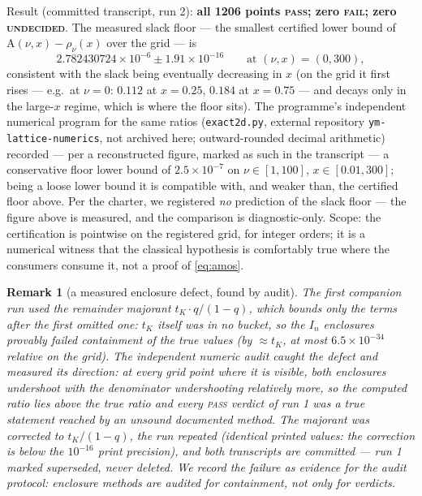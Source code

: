 \documentclass[11pt]{article}
\newtheorem{remark}[theorem]{Remark}
\newcommand{\lean}[1]{\texttt{#1}}
\newcommand{\RHS}{\mathrm{A}}
\begin{document}
Result (committed transcript, run 2): \textbf{all 1206 points
\textsc{pass}; zero \textsc{fail}; zero \textsc{undecided}}.  The
measured slack floor --- the smallest certified lower bound of
$\RHS(\nu,x) - \rho_\nu(x)$ over the grid --- is
\[
2.782430724 \times 10^{-6} \pm 1.91\times 10^{-16}
\qquad \text{at } (\nu, x) = (0, 300),
\]
consistent with the slack being eventually decreasing in $x$ (on the
grid it first rises --- e.g.\ at $\nu = 0$: $0.112$ at $x = 0.25$,
$0.184$ at $x = 0.75$ --- and decays only in the large-$x$ regime,
which is where the floor sits).  The programme's
independent numerical program for the same ratios
(\lean{exact2d.py}, external repository \lean{ym-lattice-numerics},
not archived here; outward-rounded decimal arithmetic) recorded ---
per a reconstructed figure, marked as such in the transcript --- a
conservative floor lower bound of $2.5\times 10^{-7}$ on
$\nu \in [1,100]$, $x \in [0.01,300]$; being a loose lower bound it
is compatible with, and weaker than, the certified floor above.
Per the charter, we registered \emph{no} prediction of the slack
floor --- the figure above is measured, and the comparison is
diagnostic-only.  Scope: the certification is pointwise on the
registered grid, for integer orders; it is a numerical witness that
the classical hypothesis is comfortably true where the consumers
consume it, not a proof of \eqref{eq:amos}.

\begin{remark}[a measured enclosure defect, found by audit]
\label{rem:tail}
The first companion run used the remainder majorant
$t_K \cdot q/(1-q)$, which bounds only the terms \emph{after} the
first omitted one: $t_K$ itself was in no bucket, so the $I_n$
enclosures provably failed containment of the true values (by
$\approx t_K$, at most $6.5\times 10^{-34}$ relative on the grid).
The independent numeric audit caught the defect and measured its
direction: at every grid point where it is visible, both enclosures
undershoot with the denominator undershooting relatively more, so
the computed ratio lies \emph{above} the true ratio and every
\textsc{pass} verdict of run 1 was a true statement reached by an
unsound documented method.  The majorant was corrected to
$t_K/(1-q)$, the run repeated (identical printed values: the
correction is below the $10^{-16}$ print precision), and both
transcripts are committed --- run 1 marked superseded, never
deleted.  We record the failure as evidence for the audit protocol:
enclosure methods are audited for containment, not only for
verdicts.
\end{remark}
\end{document}
